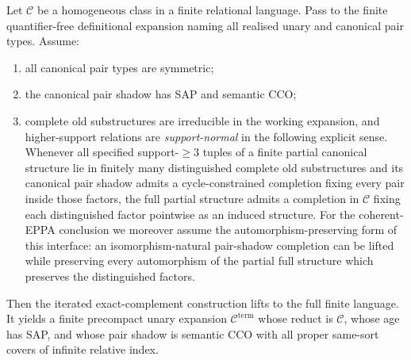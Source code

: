 \begin{theorem}
\label{thm:full-language-elimination}
Let $\mathcal C$ be a homogeneous class in a finite relational language.
Pass to the finite quantifier-free definitional expansion naming all realised
unary and canonical pair types.  Assume:
\begin{enumerate}[label=(\roman*)]
\item all canonical pair types are symmetric;
\item the canonical pair shadow has SAP and semantic CCO;
\item complete old substructures are irreducible in the working expansion,
      and higher-support relations are \emph{support-normal} in the following
      explicit sense.  Whenever all specified support-$\ge3$ tuples of a
      finite partial canonical structure lie in finitely many distinguished
      complete old substructures and its canonical pair shadow admits a
      cycle-constrained completion fixing every pair inside those factors,
      the full partial structure admits a completion in $\mathcal C$ fixing
      each distinguished factor pointwise as an induced structure.  For the
      coherent-EPPA conclusion we moreover assume the automorphism-preserving
      form of this interface: an isomorphism-natural pair-shadow completion
      can be lifted while preserving every automorphism of the partial full
      structure which preserves the distinguished factors.
\end{enumerate}
Then the iterated exact-complement construction lifts to the full finite
language.  It yields a finite precompact unary expansion
$\mathcal C^{\mathrm{term}}$ whose reduct is $\mathcal C$, whose age has SAP,
and whose pair shadow is semantic CCO with all proper same-sort covers of
infinite relative index.
\end{theorem}

